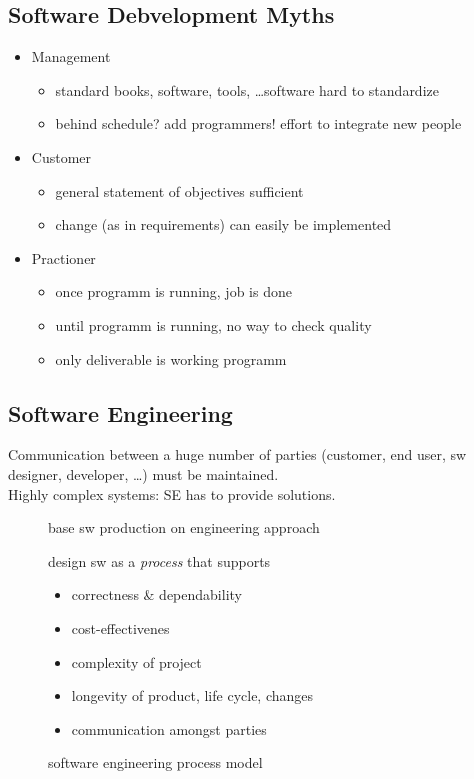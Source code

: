 \documentclass[a4paper, 10pt]{article}
\begin{document}
\subsection{Software Debvelopment Myths}
\begin{itemize}
	\item Management
		\begin{itemize}
			\item standard books, software, tools, \dots \follows software hard to standardize
			\item behind schedule? add programmers! \follows effort to integrate new people
		\end{itemize}
	\item Customer
		\begin{itemize}
			\item general statement of objectives sufficient
			\item change (as in requirements) can easily be implemented
		\end{itemize}
	\item Practioner
		\begin{itemize}
			\item once programm is running, job is done
			\item until programm is running, no way to check quality
			\item only deliverable is working programm
		\end{itemize}
\end{itemize}

\subsection{Software Engineering}
Communication between a huge number of parties (customer, end user, sw designer, developer, \dots) must be maintained. \\
Highly complex systems: SE has to provide solutions.

\begin{description}
	\item[\follows] base sw production on engineering approach
	\item[\follows] design sw as a \emph{process} that supports
		\begin{itemize}
			\item correctness \& dependability
			\item cost-effectivenes
			\item complexity of project
			\item longevity of product, life cycle, changes
			\item communication amongst parties
		\end{itemize}
	\item[\follows] software engineering process model
\end{description}
\end{document}
